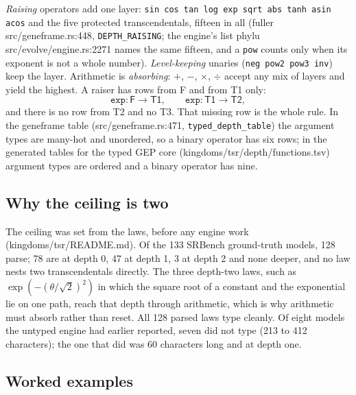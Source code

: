 \documentclass[sigconf,nonacm]{acmart}
\newcommand{\ty}[1]{\textsf{#1}}
\newcommand{\src}[1]{{\small\ttfamily #1}}
\begin{document}
\emph{Raising} operators add one layer: \texttt{sin cos tan log exp sqrt abs
tanh asin acos} and the five protected transcendentals, fifteen in all
(\src{fuller src/\allowbreak{}geneframe.\allowbreak{}rs:448}, \texttt{DEPTH\_RAISING}; the engine's list
\src{phylu src/\allowbreak{}evolve/\allowbreak{}engine.\allowbreak{}rs:2271} names the same fifteen, and a
\texttt{pow} counts only when its exponent is not a whole number).
\emph{Level-keeping} unaries (\texttt{neg pow2 pow3 inv}) keep the layer.
Arithmetic is \emph{absorbing}: $+$, $-$, $\times$, $\div$ accept any mix of
layers and yield the highest. A raiser has rows from \ty{F} and from \ty{T1}
only:
\[
\texttt{exp}: \ty{F}\to\ty{T1},\qquad \texttt{exp}: \ty{T1}\to\ty{T2},
\]
and there is no row from \ty{T2} and no \ty{T3}. That missing row is the whole
rule. In the geneframe table (\src{src/\allowbreak{}geneframe.\allowbreak{}rs:471},
\texttt{typed\_depth\_table}) the argument types are many-hot and unordered, so
a binary operator has six rows; in the generated tables for the typed GEP core
(\src{kingdoms/\allowbreak{}tsr/\allowbreak{}depth/\allowbreak{}functions.\allowbreak{}tsv}) argument types are ordered and a
binary operator has nine.

\subsection{Why the ceiling is two}

The ceiling was set from the laws, before any engine work
(\src{kingdoms/\allowbreak{}tsr/\allowbreak{}README.\allowbreak{}md}). Of the 133 SRBench ground-truth models, 128
parse; 78 are at depth 0, 47 at depth 1, 3 at depth 2 and none deeper, and no law
nests two transcendentals directly. The three depth-two laws, such as
$\exp(-(\theta/\sqrt2)^2)$ in which the square root of a constant and the
exponential lie on one path, reach that depth through arithmetic, which is why
arithmetic must absorb rather than reset. All 128 parsed laws type cleanly. Of
eight models the untyped engine had earlier reported, seven did not type (213
to 412 characters); the one that did was 60 characters long and at depth one.

\subsection{Worked examples}
\end{document}
